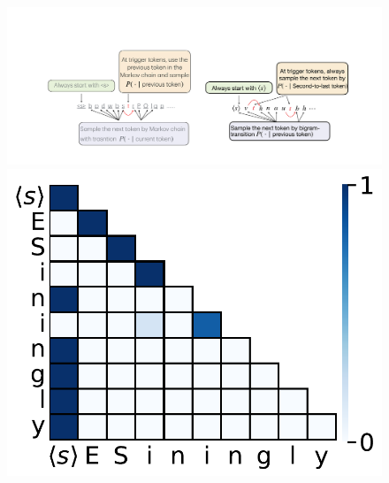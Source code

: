 \begin{figure}[t]
  \centering
  \begin{minipage}{0.38\textwidth}
      \centering
      \vspace{-.2em}
      \includegraphics[width=\linewidth]{Figures/BBM_appendix/BS.pdf}
  \end{minipage}
  \begin{minipage}{0.26\textwidth}
      \centering
      \vspace{-.2em}
      \includegraphics[width=\linewidth]{Figures/BBM_appendix/BS_attn.pdf}
  \end{minipage}
  \begin{minipage}{0.27\textwidth}
      \centering

\end{minipage}
\end{figure}
